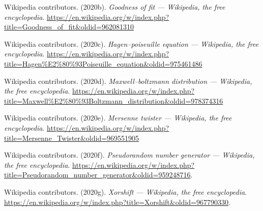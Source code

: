 \documentclass[
]{article}
\newlength{\cslhangindent}
\newenvironment{cslreferences}%
  {\setlength{\parindent}{0pt}%
  \everypar{\setlength{\hangindent}{\cslhangindent}}\ignorespaces}%
  {\par}
\begin{document}
\begin{cslreferences}
\leavevmode\hypertarget{ref-wiki:goodnessoffit}{}%
Wikipedia contributors. (2020b). \emph{Goodness of fit --- Wikipedia,
the free encyclopedia}.
\url{https://en.wikipedia.org/w/index.php?title=Goodness_of_fit\&oldid=962081310}

\leavevmode\hypertarget{ref-wiki:poseuille_equation}{}%
Wikipedia contributors. (2020c). \emph{Hagen--poiseuille equation ---
Wikipedia, the free encyclopedia}.
\url{https://en.wikipedia.org/w/index.php?title=Hagen\%E2\%80\%93Poiseuille_equation\&oldid=975461486}

\leavevmode\hypertarget{ref-wiki:maxwell_boltzmann}{}%
Wikipedia contributors. (2020d). \emph{Maxwell--boltzmann distribution
--- Wikipedia, the free encyclopedia}.
\url{https://en.wikipedia.org/w/index.php?title=Maxwell\%E2\%80\%93Boltzmann_distribution\&oldid=978374316}

\leavevmode\hypertarget{ref-wiki:mersennetwister}{}%
Wikipedia contributors. (2020e). \emph{Mersenne twister --- Wikipedia,
the free encyclopedia}.
\url{https://en.wikipedia.org/w/index.php?title=Mersenne_Twister\&oldid=969551905}

\leavevmode\hypertarget{ref-wiki:prng}{}%
Wikipedia contributors. (2020f). \emph{Pseudorandom number generator ---
Wikipedia, the free encyclopedia}.
\url{https://en.wikipedia.org/w/index.php?title=Pseudorandom_number_generator\&oldid=959248716}.

\leavevmode\hypertarget{ref-wiki:xorshift}{}%
Wikipedia contributors. (2020g). \emph{Xorshift --- Wikipedia, the free
encyclopedia}.
\url{https://en.wikipedia.org/w/index.php?title=Xorshift\&oldid=967790330}.
\end{cslreferences}
\end{document}
